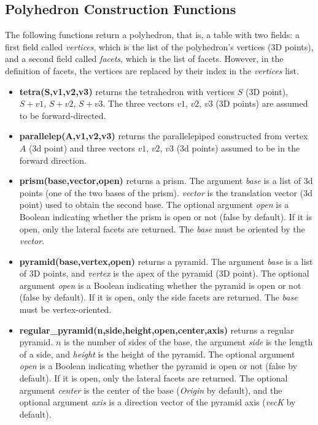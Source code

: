 \subsection{Polyhedron Construction Functions}

The following functions return a polyhedron, that is, a table with two fields: a first field called \emph{vertices}, which is the list of the polyhedron's vertices (3D points), and a second field called \emph{facets}, which is the list of facets. However, in the definition of facets, the vertices are replaced by their index in the \emph{vertices} list.

\begin{itemize}
    \item \textbf{tetra(S,v1,v2,v3)} returns the tetrahedron with vertices $S$ (3D point), $S+v1$, $S+v2$, $S+v3$. The three vectors $v1$, $v2$, $v3$ (3D points) are assumed to be forward-directed.

    \item \textbf{parallelep(A,v1,v2,v3)} returns the parallelepiped constructed from vertex $A$ (3d point) and three vectors $v1$, $v2$, $v3$ (3d points) assumed to be in the forward direction.

    \item \textbf{prism(base,vector,open)} returns a prism. The argument \emph{base} is a list of 3d points (one of the two bases of the prism). \emph{vector} is the translation vector (3d point) used to obtain the second base. The optional argument \emph{open} is a Boolean indicating whether the prism is open or not (false by default). If it is open, only the lateral facets are returned. The \emph{base} must be oriented by the \emph{vector}.

    \item \textbf{pyramid(base,vertex,open)} returns a pyramid. The argument \emph{base} is a list of 3D points, and \emph{vertex} is the apex of the pyramid (3D point). The optional argument \emph{open} is a Boolean indicating whether the pyramid is open or not (false by default). If it is open, only the side facets are returned. The \emph{base} must be vertex-oriented.

    \item \textbf{regular\_pyramid(n,side,height,open,center,axis)} returns a regular pyramid. $n$ is the number of sides of the base, the argument \emph{side} is the length of a side, and \emph{height} is the height of the pyramid. The optional argument \emph{open} is a Boolean indicating whether the pyramid is open or not (false by default). If it is open, only the lateral facets are returned. The optional argument \emph{center} is the center of the base (\emph{Origin} by default), and the optional argument \emph{axis} is a direction vector of the pyramid axis (\emph{vecK} by default).


\end{itemize}
